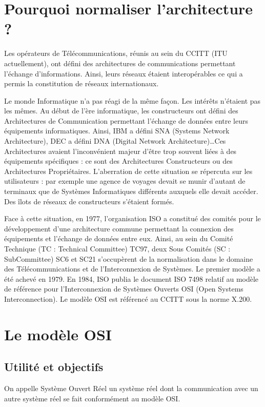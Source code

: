 \section{Pourquoi normaliser l'architecture ?}
Les opérateurs de Télécommunications, réunis au sein du CCITT (ITU actuellement), ont défini des architectures de communications permettant l'échange d'informations. Ainsi, leurs réseaux étaient interopérables ce qui a permis la constitution de réseaux internationaux.

Le monde Informatique n'a pas réagi de la même façon. Les intérêts n'étaient pas les mêmes. Au début de l'ère informatique, les constructeurs ont défini des Architectures de Communication permettant l'échange de données entre leurs équipements informatiques. Ainsi, IBM a défini SNA (Systems Network Architecture), DEC a défini DNA (Digital Network Architecture)\ldots Ces Architectures avaient l'inconvénient majeur d'être trop souvent liées à des équipements spécifiques : ce sont des Architectures Constructeurs ou des Architectures Propriétaires. L'aberration de cette situation se répercuta sur les utilisateurs : par exemple une agence de voyages devait se munir d'autant de terminaux que de Systèmes Informatiques différents auxquels elle devait accéder. Des îlots de réseaux de constructeurs s'étaient formés.

Face à cette situation, en 1977, l'organisation ISO a constitué des comités pour le développement d'une architecture commune permettant la connexion des équipements et l'échange de données entre eux. Ainsi, au sein du Comité Technique (TC : Technical Committee) TC97, deux Sous Comités (SC : SubCommittee) SC6 et SC21 s'occupèrent de la normalisation dans le domaine des Télécommunications et de l'Interconnexion de Systèmes. Le premier modèle a été achevé en 1979. En 1984, ISO publia le document ISO 7498 relatif au modèle de référence pour l'Interconnexion de Systèmes Ouverts OSI (Open Systems Interconnection). Le modèle OSI est référencé au CCITT sous la norme X.200. 

\section{Le modèle OSI}
\subsection{Utilité et objectifs}
On appelle Système Ouvert Réel un système réel dont la communication avec un autre système réel se fait conformément au modèle OSI.

